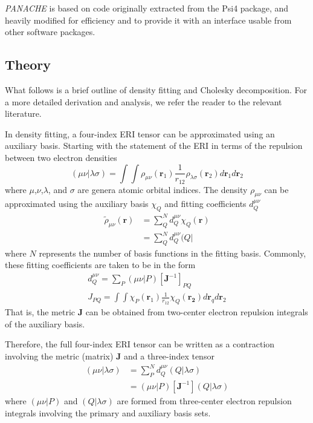 \documentclass[12pt,letterpaper]{article}
\renewcommand{\vec}[1]{\ensuremath{\bm{#1}}\xspace}
\newcommand{\mat}[1]{\ensuremath{\bm{#1}}\xspace}
\newcommand{\panache}{\textit{PANACHE}\xspace}
\begin{document}
\panache is based on code originally extracted from the
Psi4\cite{Turney:2012a} package, and heavily modified for efficiency
and to provide it with an interface usable from other software packages.


\subsection{Theory}
\label{sec:theory}

What follows is a brief outline of density fitting and Cholesky decomposition.
For a more detailed derivation and analysis, we refer the reader to the
relevant literature.

In density fitting,\cite{Werner:2003a,Dunlap:1977a,Dunlap:1979a,Whitten:1973a} a four-index ERI tensor can be approximated
using an auxiliary basis. Starting with the statement of the ERI
in terms of the repulsion between two electron densities
%
\begin{equation}
(\mu \nu | \lambda \sigma) = \int \int \rho_{\mu \nu}(\vec{r}_1) \frac{1}{r_{12}} \rho_{\lambda \sigma}(\vec{r}_2) d\vec{r}_1 d\vec{r}_2
\end{equation}
%
where $\mu$,$\nu$,$\lambda$, and $\sigma$ are genera atomic orbital indices.
The density $\rho_{\mu\nu}$ can be approximated using the auxiliary basis $\chi_Q$
and fitting coefficients $d_Q^{\mu\nu}$
%
\begin{align}
\tilde{\rho}_{\mu\nu}(\vec{r}) &= \sum_Q^{N}d_Q^{\mu\nu} \chi_Q(\vec{r}) \\
                           &= \sum_Q^{N}d_Q^{\mu\nu} ( Q |
\end{align}
%
where $N$ represents the number of basis functions in the fitting basis.
Commonly, these fitting coefficients are taken to be in the form\cite{Dunlap:1977a,Dunlap:1979a}
%
\begin{gather}
d_Q^{\mu\nu} = \sum_P (\mu\nu | P)[\mat{J}^{-1}]_{PQ} \\
J_{PQ} = \int \int \chi_P(\vec{r}_1) \frac{1}{r_{12}} \chi_Q(\vec{r_2}) d\vec{r}_q d\vec{r}_2 \label{eqn:metric}
\end{gather}
%
That is, the metric $\mat{J}$ can be obtained from two-center electron repulsion integrals
of the auxiliary basis.

Therefore, the full four-index ERI tensor can be written as a contraction involving
the metric (matrix) $\mat{J}$ and a three-index tensor
%
\begin{align}
(\mu\nu|\lambda\sigma) &= \sum_P^{N}d_Q^{\mu\nu} (Q | \lambda\sigma) \\
        &= (\mu\nu | P) [\mat{J}^{-1}] (Q | \lambda\sigma) \label{eqn:df-final}
\end{align}
%
where $(\mu\nu | P)$ and $(Q | \lambda\sigma)$ are formed from three-center electron
repulsion integrals involving the primary and auxiliary basis sets.
\end{document}
